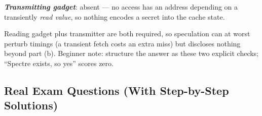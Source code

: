 \documentclass[12pt, a4paper]{article}
\newcommand{\term}[1]{\textbf{\textit{#1}}}        %
\begin{document}
\begin{itemize}
\begin{tightitem}
        \item \term{Transmitting gadget}: absent --- no access has an address depending on a transiently \emph{read value}, so nothing encodes a secret into the cache state.
    \end{tightitem}
    Reading gadget plus transmitter are both required, so speculation can at worst perturb timings (a transient fetch costs an extra miss) but discloses nothing beyond part (b). Beginner note: structure the answer as these two explicit checks; ``Spectre exists, so yes'' scores zero.
\end{itemize}

\subsection*{Real Exam Questions (With Step-by-Step Solutions)}
\end{document}
